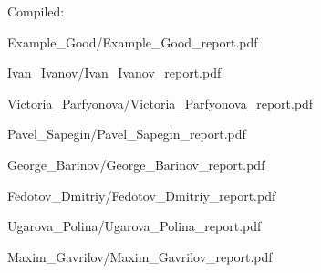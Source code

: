 \documentclass[a4paper]{article}
\begin{document}
Compiled: \DTMnow
\tableofcontents

\clearpage

{Example_Good/Example_Good_report.pdf}

{Ivan_Ivanov/Ivan_Ivanov_report.pdf}

{Victoria_Parfyonova/Victoria_Parfyonova_report.pdf}

{Pavel_Sapegin/Pavel_Sapegin_report.pdf}

{George_Barinov/George_Barinov_report.pdf}

{Fedotov_Dmitriy/Fedotov_Dmitriy_report.pdf}


{Ugarova_Polina/Ugarova_Polina_report.pdf}


{Maxim_Gavrilov/Maxim_Gavrilov_report.pdf}
\end{document}
